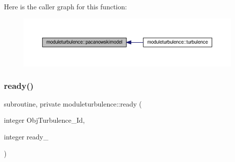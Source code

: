 Here is the caller graph for this function\+:\nopagebreak
\begin{figure}[H]
\begin{center}
\leavevmode
\includegraphics[width=350pt]{namespacemoduleturbulence_ac17c49932990b363ac1d4fc06653ff7a_icgraph}
\end{center}
\end{figure}
\mbox{\label{namespacemoduleturbulence_aee156286cd0fad2976b9e8c3c1d52ec6}} 
\subsubsection{\texorpdfstring{ready()}{ready()}}
{\footnotesize\ttfamily subroutine, private moduleturbulence\+::ready (\begin{DoxyParamCaption}\item[{integer}]{Obj\+Turbulence\+\_\+\+Id,  }\item[{integer}]{ready\+\_\+ }\end{DoxyParamCaption})\hspace{0.3cm}{\ttfamily [private]}}


